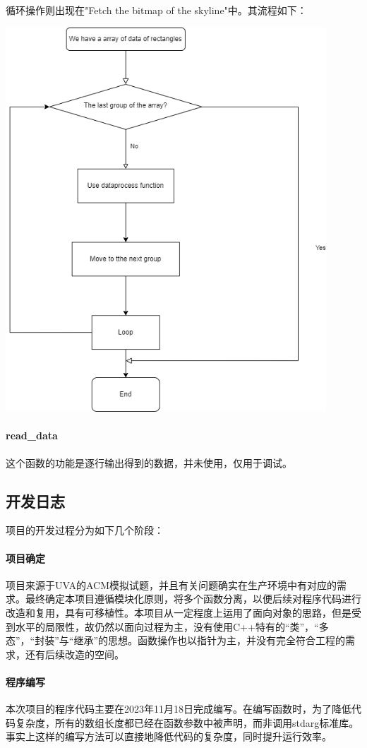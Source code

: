 \documentclass[a4paper]{ctexart}
\begin{document}
	循环操作则出现在"Fetch the bitmap of the skyline"中。其流程如下：
	\begin{center}
		\includegraphics[width=12cm]{mindmap1.png}
	\end{center}

	\paragraph{read\_data}
	这个函数的功能是逐行输出得到的数据，并未使用，仅用于调试。
	\subsection{开发日志}
	项目的开发过程分为如下几个阶段：
	\paragraph{项目确定}
	项目来源于UVA的ACM模拟试题，并且有关问题确实在生产环境中有对应的需求。最终确定本项目遵循模块化原则，将多个函数分离，以便后续对程序代码进行改造和复用，具有可移植性。本项目从一定程度上运用了面向对象的思路，但是受到水平的局限性，故仍然以面向过程为主，没有使用C++特有的“类”，“多态”，“封装”与“继承”的思想。函数操作也以指针为主，并没有完全符合工程的需求，还有后续改造的空间。
	\paragraph{程序编写}
	本次项目的程序代码主要在2023年11月18日完成编写。在编写函数时，为了降低代码复杂度，所有的数组长度都已经在函数参数中被声明，而非调用stdarg标准库。事实上这样的编写方法可以直接地降低代码的复杂度，同时提升运行效率。
\end{document}
